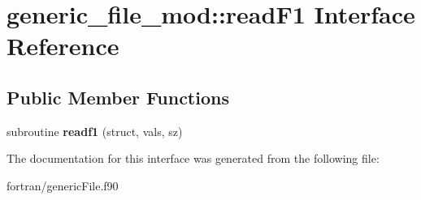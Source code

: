 \hypertarget{interfacegeneric__file__mod_1_1read_f1}{}\section{generic\+\_\+file\+\_\+mod\+:\+:read\+F1 Interface Reference}
\label{interfacegeneric__file__mod_1_1read_f1}
\subsection*{Public Member Functions}
\begin{DoxyCompactItemize}
\item 
\mbox{\label{interfacegeneric__file__mod_1_1read_f1_adc34ded77f163affdeeab8cbc5d8b326}} 
subroutine {\bfseries readf1} (struct, vals, sz)
\end{DoxyCompactItemize}


The documentation for this interface was generated from the following file\+:\begin{DoxyCompactItemize}
\item 
fortran/generic\+File.\+f90\end{DoxyCompactItemize}
